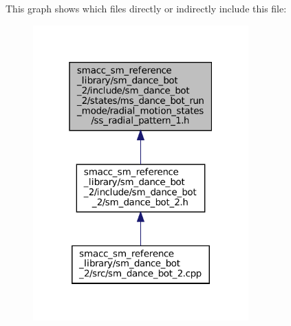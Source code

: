 This graph shows which files directly or indirectly include this file\+:
\nopagebreak
\begin{figure}[H]
\begin{center}
\leavevmode
\includegraphics[width=235pt]{sm__dance__bot__2_2include_2sm__dance__bot__2_2states_2ms__dance__bot__run__mode_2radial__motion7d355ae087a57993fd67f5c89eb36f0a}
\end{center}
\end{figure}
